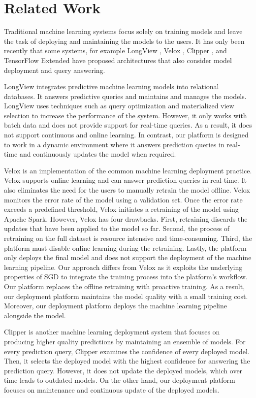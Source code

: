 \section{Related Work} \label{related-work}
Traditional machine learning systems focus solely on training models and leave the task of deploying and maintaining the models to the users.
It has only been recently that some systems, for example LongView \cite{akdere2011case}, Velox \cite{crankshaw2014missing}, Clipper \cite{crankshaw2016clipper} , and TensorFlow Extended \cite{baylor2017tfx} have proposed architectures that also consider model deployment and query answering.

LongView integrates predictive machine learning models into relational databases. 
It answers predictive queries and maintains and manages the models.
LongView uses techniques such as query optimization and materialized view selection to increase the performance of the system.
However, it only works with batch data and does not provide support for real-time queries. 
As a result, it does not support continuous and online learning.
In contrast, our platform is designed to work in a dynamic environment where it answers prediction queries in real-time and continuously updates the model when required.

Velox is an implementation of the common machine learning deployment practice.
Velox supports online learning and can answer prediction queries in real-time.
It also eliminates the need for the users to manually retrain the model offline.
Velox monitors the error rate of the model using a validation set.
Once the error rate exceeds a predefined threshold, Velox initiates a retraining of the model using Apache Spark. 
However, Velox has four drawbacks.
First, retraining discards the updates that have been applied to the model so far.
Second, the process of retraining on the full dataset is resource intensive and time-consuming.
Third, the platform must disable online learning during the retraining.
Lastly, the platform only deploys the final model and does not support the deployment of the machine learning pipeline.
Our approach differs from Velox as it exploits the underlying properties of SGD to integrate the training process into the platform's workflow.
Our platform replaces the offline retraining with proactive training.
As a result, our deployment platform maintains the model quality with a small training cost.
Moreover, our deployment platform deploys the machine learning pipeline alongside the model.

Clipper is another machine learning deployment system that focuses on producing higher quality predictions by maintaining an ensemble of models.
For every prediction query, Clipper examines the confidence of every deployed model.
Then, it selects the deployed model with the highest confidence for answering the prediction query.
However, it does not update the deployed models, which over time leads to outdated models.
On the other hand, our deployment platform focuses on maintenance and continuous update of the deployed models.

